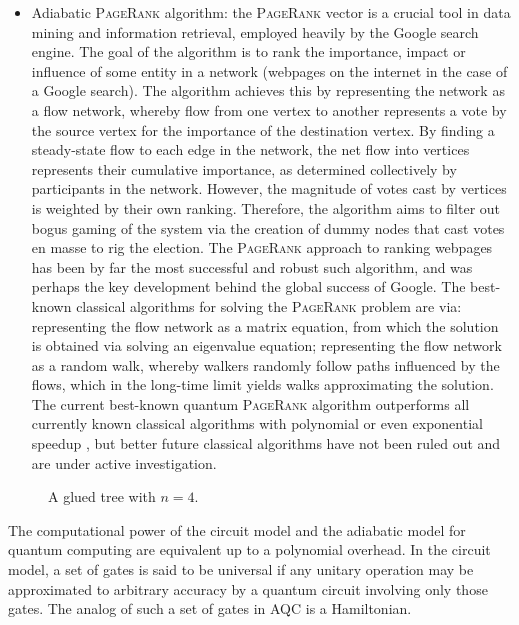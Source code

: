 \begin{itemize}
\item Adiabatic \textsc{PageRank} algorithm: the \textsc{PageRank} vector is a crucial tool in data mining and information retrieval, employed heavily by the Google search engine. The goal of the algorithm is to rank the importance, impact or influence of some entity in a network (webpages on the internet in the case of a Google search). The algorithm achieves this by representing the network as a flow network, whereby flow from one vertex to another represents a vote by the source vertex for the importance of the destination vertex. By finding a steady-state flow to each edge in the network, the net flow into vertices represents their cumulative importance, as determined collectively by participants in the network. However, the magnitude of votes cast by vertices is weighted by their own ranking. Therefore, the algorithm aims to filter out bogus gaming of the system via the creation of dummy nodes that cast votes en masse to rig the election. The \textsc{PageRank} approach to ranking webpages has been by far the most successful and robust such algorithm, and was perhaps the key development behind the global success of Google. The best-known classical algorithms for solving the \textsc{PageRank} problem are via: representing the flow network as a matrix equation, from which the solution is obtained via solving an eigenvalue equation; representing the flow network as a random walk, whereby walkers randomly follow paths influenced by the flows, which in the long-time limit yields walks approximating the solution. The current best-known quantum \textsc{PageRank} algorithm outperforms all currently known classical algorithms with polynomial or even exponential speedup \cite{bib:PhysRevLett.108.230506}, but better future classical algorithms have not been ruled out and are under active investigation.
\end{itemize}

\begin{figure}[!htbp]
	\captionspacefig \caption{A glued tree with \mbox{$n=4$}.} \label{fig:glued_tree}
\end{figure}

The computational power of the circuit model and the adiabatic model for quantum computing are equivalent up to a polynomial overhead. In the circuit model, a set of gates is said to be universal if any unitary operation may be approximated to arbitrary accuracy by a quantum circuit involving only those gates. The analog of such a set of gates in AQC is a Hamiltonian.

